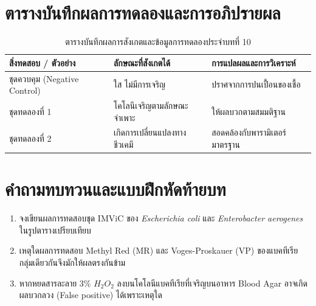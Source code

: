 \section{ตารางบันทึกผลการทดลองและการอภิปรายผล}
\begin{table}[H]
\centering\small
\caption{ตารางบันทึกผลการสังเกตและข้อมูลการทดลองประจำบทที่ 10}
\label{tab:ch10_datasheet}
\begin{tabularx}{\textwidth}{p{} p{} X}
\toprule
\textbf{สิ่งทดสอบ / ตัวอย่าง} & \textbf{ลักษณะที่สังเกตได้} & \textbf{การแปลผลและการวิเคราะห์} \\
\midrule
ชุดควบคุม (Negative Control) & ใส ไม่มีการเจริญ & ปราศจากการปนเปื้อนของเชื้อ \\
ชุดทดลองที่ 1 & โคโลนีเจริญตามลักษณะจำเพาะ & ให้ผลบวกตามสมมติฐาน \\
ชุดทดลองที่ 2 & เกิดการเปลี่ยนแปลงทางชีวเคมี & สอดคล้องกับพารามิเตอร์มาตรฐาน \\
\bottomrule
\end{tabularx}
\end{table}

\section{คำถามทบทวนและแบบฝึกหัดท้ายบท}
\begin{enumerate}
    \item จงเขียนผลการทดสอบชุด IMViC ของ \textit{Escherichia coli} และ \textit{Enterobacter aerogenes} ในรูปตารางเปรียบเทียบ
    \item เหตุใดผลการทดสอบ Methyl Red (MR) และ Voges-Proskauer (VP) ของแบคทีเรียกลุ่มเดียวกันจึงมักให้ผลตรงกันข้าม
    \item หากหยดสารละลาย 3\% $H_2O_2$ ลงบนโคโลนีแบคทีเรียที่เจริญบนอาหาร Blood Agar อาจเกิดผลบวกลวง (False positive) ได้เพราะเหตุใด
\end{enumerate}
